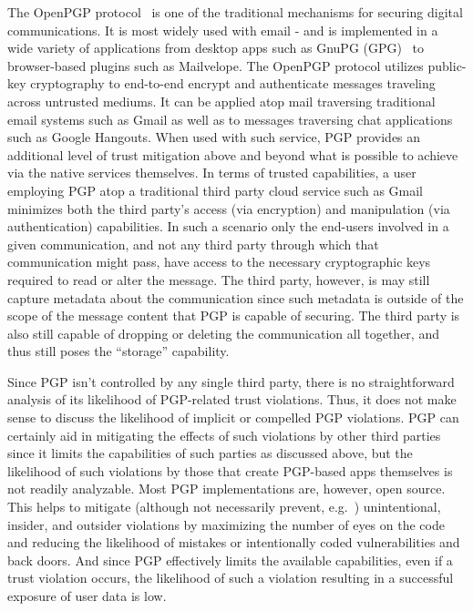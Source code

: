 The OpenPGP protocol~\cite{callas2007} is one of the traditional
mechanisms for securing digital communications. It is most widely used
with email - and is implemented in a wide variety of applications from
desktop apps such as GnuPG (GPG)~\cite{gnupg} to browser-based plugins
such as Mailvelope\cite{mailvelope}. The OpenPGP protocol utilizes
public-key cryptography to end-to-end encrypt and authenticate
messages traveling across untrusted mediums. It can be applied atop
mail traversing traditional email systems such as Gmail as well as to
messages traversing chat applications such as Google Hangouts. When
used with such service, PGP provides an additional level of trust
mitigation above and beyond what is possible to achieve via the native
services themselves. In terms of trusted capabilities, a user
employing PGP atop a traditional third party cloud service such as
Gmail minimizes both the third party's access (via encryption) and
manipulation (via authentication) capabilities. In such a scenario
only the end-users involved in a given communication, and not any
third party through which that communication might pass, have access
to the necessary cryptographic keys required to read or alter the
message. The third party, however, is may still capture metadata about
the communication since such metadata is outside of the scope of the
message content that PGP is capable of securing. The third party is
also still capable of dropping or deleting the communication all
together, and thus still poses the ``storage'' capability.

Since PGP isn't controlled by any single third party, there is no
straightforward analysis of its likelihood of PGP-related trust
violations. Thus, it does not make sense to discuss the likelihood of
implicit or compelled PGP violations. PGP can certainly aid in
mitigating the effects of such violations by other third parties since
it limits the capabilities of such parties as discussed above, but the
likelihood of such violations by those that create PGP-based apps
themselves is not readily analyzable. Most PGP implementations are,
however, open source. This helps to mitigate (although not necessarily
prevent, e.g.~\cite{heartbleed}) unintentional, insider, and outsider
violations by maximizing the number of eyes on the code and reducing
the likelihood of mistakes or intentionally coded vulnerabilities and
back doors. And since PGP effectively limits the available
capabilities, even if a trust violation occurs, the likelihood of such
a violation resulting in a successful exposure of user data is low.

